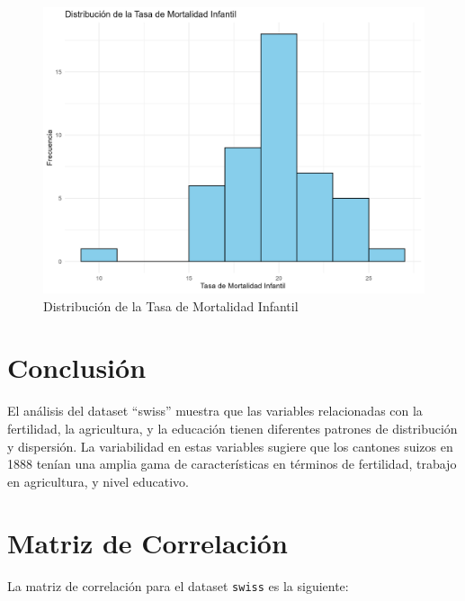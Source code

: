 \documentclass{article}
\begin{document}
\begin{figure}[h!]
\centering
\includegraphics[width=\textwidth]{Histogramas/histogram_infant_mortality.png}
\caption{Distribución de la Tasa de Mortalidad Infantil}
\end{figure}

\section{Conclusión}
El análisis del dataset ``swiss'' muestra que las variables relacionadas con la fertilidad, la agricultura, y la educación tienen diferentes patrones de distribución y dispersión. La variabilidad en estas variables sugiere que los cantones suizos en 1888 tenían una amplia gama de características en términos de fertilidad, trabajo en agricultura, y nivel educativo.

\section{Matriz de Correlación}

La matriz de correlación para el dataset \texttt{swiss} es la siguiente:
\end{document}
